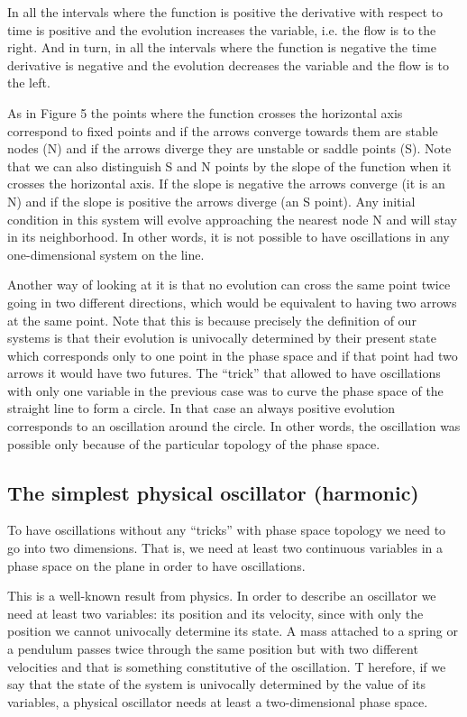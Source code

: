 \documentclass{article}
\begin{document}
In all the intervals where the function is positive the derivative with respect to time is positive and the evolution increases the variable, i.e. the flow is to the right. 
And in turn, in all the intervals where the function is negative the time derivative is negative and the evolution decreases the variable and the flow is to the left.

As in Figure 5 the points where the function crosses the horizontal axis correspond to fixed points and if the arrows converge towards them are stable nodes (N) and if the arrows diverge they are unstable or saddle points (S). 
Note that we can also distinguish S and N points by the slope of the function when it crosses the horizontal axis. 
If the slope is negative the arrows converge (it is an N) and if the slope is positive the arrows diverge (an S point). 
Any initial condition in this system will evolve approaching the nearest node N and will stay in its neighborhood. In other words, it is not possible to have oscillations in any one-dimensional system on the line. 

Another way of looking at it is that no evolution can cross the same point twice going in two different directions, which would be equivalent to having two arrows at the same point. 
Note that this is because precisely the definition of our systems is that their evolution is univocally determined by their present state which corresponds only to one point in the phase space and if that point had two arrows it would have two futures. 
The “trick” that allowed to have oscillations with only one variable in the previous case was to curve the phase space of the straight line to form a circle. 
In that case an always positive evolution corresponds to an oscillation around the circle. 
In other words, the oscillation was possible only because of the particular topology of the phase space. 

\subsection{The simplest physical oscillator (harmonic)}

To have oscillations without any “tricks” with phase space topology we need to go into two dimensions. 
That is, we need at least two continuous variables in a phase space on the plane in order to have oscillations. 

This is a well-known result from physics. 
In order to describe an oscillator we need at least two variables: its position and its velocity, since with only the position we cannot univocally determine its state. 
A mass attached to a spring or a pendulum passes twice through the same position but with two different velocities and that is something constitutive of the oscillation. T
herefore, if we say that the state of the system is univocally determined by the value of its variables, a physical oscillator needs at least a two-dimensional phase space. 
\end{document}
